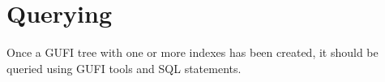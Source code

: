 \section{Querying}
Once a GUFI tree with one or more indexes has been created, it should
be queried using GUFI tools and SQL statements.







